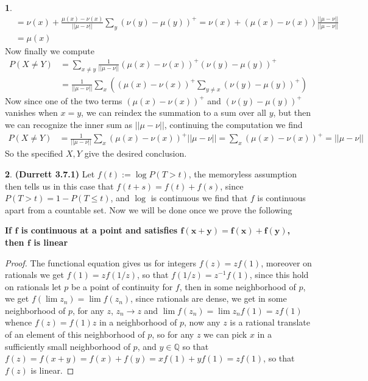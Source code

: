 \documentclass{article}
\theoremstyle{definition}
\newtheorem{pb}{}
\newcommand{\norm}[1]{\lvert\lvert#1\rvert\rvert}
\begin{document}
\begin{pb}
\begin{align*}
            &= \nu(x) + \frac{\mu(x) - \nu(x)}{\norm{\mu - \nu}}\sum_y (\nu(y)-\mu(y))^+ = \nu(x) + (\mu(x) - \nu(x))\frac{\norm{\mu-\nu}}{\norm{\mu-\nu}} \\ &= \mu(x)
        \end{align*}
        Now finally we compute
        \begin{align*}
            P(X \neq Y) &= \sum_{x\neq y} \frac{1}{\norm{\mu-\nu}}(\mu(x) - \nu(x))^+(\nu(y)-\mu(y))^+ \\
            &= \frac{1}{\norm{\mu-\nu}} \sum_x \left((\mu(x) - \nu(x))^+\sum_{y \neq x}(\nu(y)-\mu(y))^+\right)
        \end{align*}
        Now since one of the two terms \((\mu(x) - \nu(x))^+\) and \((\nu(y)-\mu(y))^+\) vanishes when \(x = y\), we can reindex the summation to a sum over all \(y\), but then we can recognize the inner sum as \(\norm{\mu - \nu}\), continuing the computation we find
        \begin{align*}
            P(X \neq Y) &= \frac{1}{\norm{\mu-\nu}} \sum_x (\mu(x) - \nu(x))^+\norm{\mu-\nu} = \sum_x (\mu(x) - \nu(x))^+ = \norm{\mu - \nu}
        \end{align*}
        So the specified \(X,Y\) give the desired conclusion.
    \end{pb}
    \begin{pb} \textbf{(Durrett 3.7.1)}
        Let \(f(t) := \log P(T > t)\), the memoryless assumption then tells us in this case that \(f(t+s)=f(t) + f(s)\), since \(P(T > t) = 1 - P(T \leq t)\), and \(\log\) is continuous we find that \(f\) is continuous apart from a countable set. Now we will be done once we prove the following

        \textbf{If \(\mathbf{f}\) is continuous at a point and satisfies \(\mathbf{f(x+y) = f(x) + f(y)}\), then \(\mathbf{f}\) is linear}
        \begin{proof}
            The functional equation gives us for integers \(f(z) = zf(1)\), moreover on rationals we get \(f(1) = zf(1/z)\), so that \(f(1/z) = z^{-1}f(1)\), since this hold on rationals let \(p\) be a point of continuity for \(f\), then in some neighborhood of \(p\), we get \(f(\lim z_n) = \lim f(z_n)\), since rationals are dense, we get in some neighborhood of \(p\), for any \(z\), \(z_n \to z\) and \(\lim f(z_n) = \lim z_n f(1) = zf(1)\) whence \(f(z) = f(1)z\) in a neighborhood of \(p\), now any \(z\) is a rational translate of an element of this neighborhood of \(p\), so for any \(z\) we can pick \(x\) in a sufficiently small neighborhood of \(p\), and \(y \in \mathbb{Q}\) so that \(f(z) = f(x + y) = f(x) + f(y) = xf(1) + yf(1) = zf(1)\), so that \(f(z)\) is linear.
        \end{proof}
    \end{pb}
\end{document}
